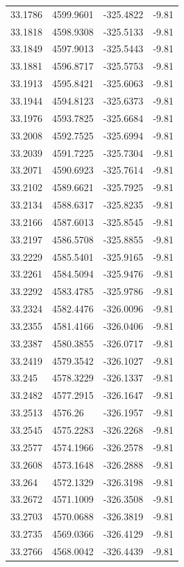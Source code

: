 \begin{table}[H]
\begin{tabular}{llll}
33.1786 & 4599.9601 & -325.4822 & -9.81 \\
33.1818 & 4598.9308 & -325.5133 & -9.81 \\
33.1849 & 4597.9013 & -325.5443 & -9.81 \\
33.1881 & 4596.8717 & -325.5753 & -9.81 \\
33.1913 & 4595.8421 & -325.6063 & -9.81 \\
33.1944 & 4594.8123 & -325.6373 & -9.81 \\
33.1976 & 4593.7825 & -325.6684 & -9.81 \\
33.2008 & 4592.7525 & -325.6994 & -9.81 \\
33.2039 & 4591.7225 & -325.7304 & -9.81 \\
33.2071 & 4590.6923 & -325.7614 & -9.81 \\
33.2102 & 4589.6621 & -325.7925 & -9.81 \\
33.2134 & 4588.6317 & -325.8235 & -9.81 \\
33.2166 & 4587.6013 & -325.8545 & -9.81 \\
33.2197 & 4586.5708 & -325.8855 & -9.81 \\
33.2229 & 4585.5401 & -325.9165 & -9.81 \\
33.2261 & 4584.5094 & -325.9476 & -9.81 \\
33.2292 & 4583.4785 & -325.9786 & -9.81 \\
33.2324 & 4582.4476 & -326.0096 & -9.81 \\
33.2355 & 4581.4166 & -326.0406 & -9.81 \\
33.2387 & 4580.3855 & -326.0717 & -9.81 \\
33.2419 & 4579.3542 & -326.1027 & -9.81 \\
33.245 & 4578.3229 & -326.1337 & -9.81 \\
33.2482 & 4577.2915 & -326.1647 & -9.81 \\
33.2513 & 4576.26 & -326.1957 & -9.81 \\
33.2545 & 4575.2283 & -326.2268 & -9.81 \\
33.2577 & 4574.1966 & -326.2578 & -9.81 \\
33.2608 & 4573.1648 & -326.2888 & -9.81 \\
33.264 & 4572.1329 & -326.3198 & -9.81 \\
33.2672 & 4571.1009 & -326.3508 & -9.81 \\
33.2703 & 4570.0688 & -326.3819 & -9.81 \\
33.2735 & 4569.0366 & -326.4129 & -9.81 \\
33.2766 & 4568.0042 & -326.4439 & -9.81 \\

\end{tabular}
\end{table}
